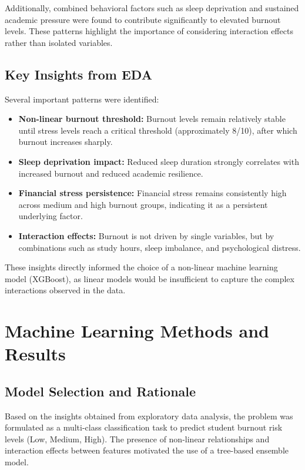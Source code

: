 \documentclass[conference]{IEEEtran}
\begin{document}
Additionally, combined behavioral factors such as sleep deprivation and sustained academic pressure were found to contribute significantly to elevated burnout levels. These patterns highlight the importance of considering interaction effects rather than isolated variables.

\subsection{Key Insights from EDA}

Several important patterns were identified:

\begin{itemize}
    \item \textbf{Non-linear burnout threshold:} Burnout levels remain relatively stable until stress levels reach a critical threshold (approximately 8/10), after which burnout increases sharply.
    \item \textbf{Sleep deprivation impact:} Reduced sleep duration strongly correlates with increased burnout and reduced academic resilience.
    \item \textbf{Financial stress persistence:} Financial stress remains consistently high across medium and high burnout groups, indicating it as a persistent underlying factor.
    \item \textbf{Interaction effects:} Burnout is not driven by single variables, but by combinations such as study hours, sleep imbalance, and psychological distress.
\end{itemize}

These insights directly informed the choice of a non-linear machine learning model (XGBoost), as linear models would be insufficient to capture the complex interactions observed in the data.

\section{Machine Learning Methods and Results}

\subsection{Model Selection and Rationale}

Based on the insights obtained from exploratory data analysis, the problem was formulated as a multi-class classification task to predict student burnout risk levels (Low, Medium, High). The presence of non-linear relationships and interaction effects between features motivated the use of a tree-based ensemble model.
\end{document}
